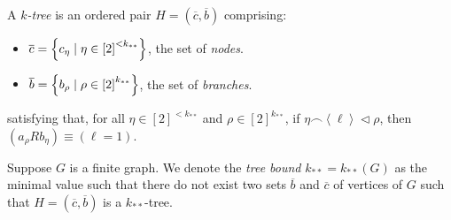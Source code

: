 
    \label{k-tree}
        A \emph{$k$-tree} is an ordered pair $H = (\overline{c},\overline{b})$ comprising:
        \begin{itemize}
            \item $\overline{c} = \left\{  c_\eta \mid \eta \in \left[ 2 \right]^{<k_{**}}  \right\}$, the set of \emph{nodes}.
            \item $\overline{b} = \left\{  b_\rho \mid \rho \in \left[ 2 \right]^{k_{**}}  \right\}$, the set of \emph{branches}.
        \end{itemize}
        satisfying that, for all $\eta \in \left[ 2 \right]^{<k_{**}}$ and $\rho \in \left[ 2 \right]^{k_{**}}$,
        if $\eta \frown \left< \ell \right> \triangleleft \rho$, then $\left( a_\rho R b_\eta \right) \equiv \left( \ell = 1 \right)$.

    \label{tree_bound}
        Suppose $G$ is a finite graph.
        We denote the \emph{tree bound} $k_{**} = k_{**}(G)$ as the minimal value such that there
        do not exist two sets $\overline{b}$ and $\overline{c}$ of vertices of $G$ such that
        $H = (\overline{c},\overline{b})$ is a $k_{**}$-tree.

